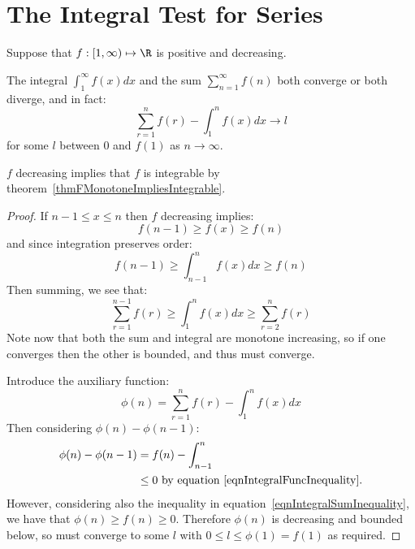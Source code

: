 \documentclass[../Main.tex]{subfiles}
\begin{document}
\section{The Integral Test for Series}
\begin{theorem}
    Suppose that $f : [1, \infty) \mapsto \R$ is positive and decreasing.
    
    The integral $\int_1^\infty f(x) dx$ and the sum $\sum_{n = 1}^\infty f(n)$ both converge or both diverge, and in fact:
    \begin{equation*}
        \sum_{r = 1}^n f(r) - \int_1^n f(x) dx \to l
    \end{equation*}
    for some $l$ between $0$ and $f(1)$ as $n \to \infty$.
    \label{thmIntegralTest}
\end{theorem}
\begin{remark}
    $f$ decreasing implies that $f$ is integrable by theorem~\ref{thmFMonotoneImpliesIntegrable}.
\end{remark}
\begin{proof}
    If $n-1 \leq x \leq n$ then $f$ decreasing implies:
    \begin{equation*}
        f(n-1) \geq f(x) \geq f(n)
    \end{equation*}
    and since integration preserves order:
    \begin{equation}
        f(n-1) \geq \int_{n-1}^n f(x) dx \geq f(n)
        \label{eqnIntegralFuncInequality}
    \end{equation}
    Then summing, we see that:
    \begin{equation}
        \sum_{r = 1}^{n-1}f(r) \geq \int_1^n f(x) dx \geq \sum_{r = 2}^n f(r)
        \label{eqnIntegralSumInequality}
    \end{equation}
    Note now that both the sum and integral are monotone increasing, so if one converges then the other is bounded, and thus must converge.

    Introduce the auxiliary function:
    \begin{equation*}
        \phi(n) = \sum_{r = 1}^n f(r) - \int_1^n f(x) dx
    \end{equation*}
    Then considering $\phi(n) - \phi(n-1)$:
    \begin{align*}
        \phi(n) - \phi(n-1) &= f(n) - \int_{n - 1}^n \\
        &\leq 0 \text{ by equation~\ref{eqnIntegralFuncInequality}.}
    \end{align*}
    However, considering also the inequality in equation~\ref{eqnIntegralSumInequality}, we have that $\phi(n) \geq f(n) \geq 0$. Therefore $\phi(n)$ is decreasing and bounded below, so must converge to some $l$ with $0 \leq l \leq \phi(1) = f(1)$ as required.
\end{proof}
\end{document}
